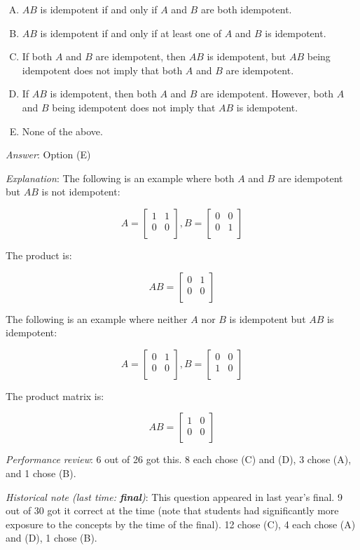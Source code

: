 \documentclass[10pt]{amsart}
\begin{document}
\begin{enumerate}
  \begin{enumerate}[(A)]
  \item $AB$ is idempotent if and only if $A$ and $B$ are both idempotent.
  \item $AB$ is idempotent if and only if at least one of $A$ and $B$ is idempotent.
  \item If both $A$ and $B$ are idempotent, then $AB$ is idempotent, but
    $AB$ being idempotent does not imply that both $A$ and $B$ are
    idempotent.
  \item If $AB$ is idempotent, then both $A$ and $B$ are
    idempotent. However, both $A$ and $B$ being idempotent does not
    imply that $AB$ is idempotent.
  \item None of the above.
  \end{enumerate}

  {\em Answer}: Option (E)

  {\em Explanation}: The following is an example where both $A$ and
  $B$ are idempotent but $AB$ is not idempotent:

  $$A = \left[\begin{matrix} 1 & 1 \\ 0 & 0 \\\end{matrix}\right], B = \left[ \begin{matrix} 0 & 0 \\ 0 & 1 \\\end{matrix}\right]$$

  The product is:

  $$AB = \left[\begin{matrix} 0 & 1 \\ 0 & 0 \\\end{matrix}\right]$$

  The following is an example where neither $A$ nor $B$ is idempotent
  but $AB$ is idempotent:

  $$A= \left[\begin{matrix} 0 & 1 \\ 0 & 0 \\\end{matrix}\right], B = \left[\begin{matrix} 0 & 0 \\ 1 & 0 \\\end{matrix}\right]$$

  The product matrix is:

  $$AB = \left[\begin{matrix} 1 & 0 \\ 0 & 0 \\\end{matrix}\right]$$

  {\em Performance review}: 6 out of 26 got this. 8 each chose (C) and
  (D), 3 chose (A), and 1 chose (B).

  {\em Historical note (last time: {\bf final})}: This question
  appeared in last year's final. 9 out of 30 got it correct at the
  time (note that students had significantly more exposure to the
  concepts by the time of the final). 12 chose (C), 4 each chose (A)
  and (D), 1 chose (B).
\end{enumerate}
\end{document}
